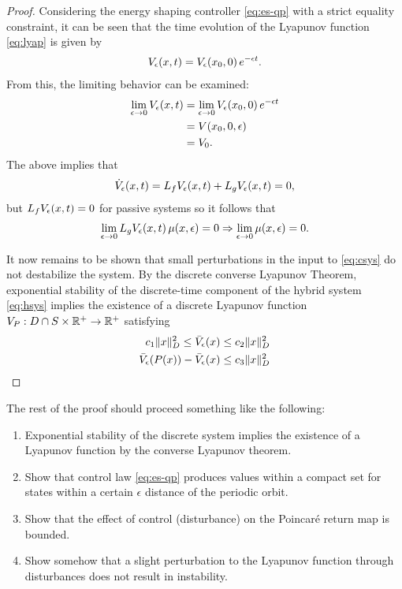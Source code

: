 \documentclass[twocolumn]{article}
\newcommand{\limeps}{\lim_{\epsilon \to 0}}
\begin{document}
\begin{proof}
  Considering the energy shaping controller \eqref{eq:es-qp} with a strict equality constraint, it can be seen that the time evolution of the Lyapunov function \eqref{eq:lyap} is given by
  \begin{align*}
    V_{\epsilon}(x, t) = V_{\epsilon}(x_{0}, 0) \, e^{-\epsilon t}.
  \end{align*}
  From this, the limiting behavior can be examined:
  \begin{align*}
    \limeps \Ve(x, t) &= \limeps \Ve(x_{0}, 0) \, e^{-\epsilon t}\\
    &= V(x_{0}, 0, \epsilon)\\
    &= V_0.
  \end{align*}
  The above implies that
  \begin{align*}
    {\dot V}_{\epsilon}(x, t) = L_{f} V_{\epsilon}(x, t) + L_{g} V_{\epsilon}(x, t) = 0,
  \end{align*}
  but $L_{f} V_{\epsilon}(x, t) = 0$ for passive systems so it follows that
  \begin{align*}
    \limeps L_{g} \Ve(x, t) \, \mu(x, \epsilon) = 0 \Rightarrow \limeps \mu(x, \epsilon) = 0.
  \end{align*}

  It now remains to be shown that small perturbations in the input to \eqref{eq:csys} do not destabilize the system.
  By the discrete converse Lyapunov Theorem, exponential stability of the discrete-time component of the hybrid system \eqref{eq:hsys} implies the existence of a discrete Lyapunov function $V_{P} : D \cap S \times \mathbb{R}^{+} \to \mathbb{R}^{+}$ satisfying
  \begin{align*}
    c_{1} \| x \|^{2}_{D} \leq \bar{V}_{\epsilon}(x) \leq c_{2} \| x \|_{D}^2\\
    \bar{V}_{\epsilon}(P(x)) - \bar{V}_{\epsilon}(x) \leq c_{3} \| x \|^{2}_{D}
  \end{align*}

\end{proof}

The rest of the proof should proceed something like the following:
\begin{enumerate}
\item Exponential stability of the discrete system implies the existence of a Lyapunov function by the converse Lyapunov theorem.
\item Show that control law \eqref{eq:es-qp} produces values within a compact set for states within a certain $\epsilon$ distance of the periodic orbit.
\item Show that the effect of control (disturbance) on the Poincar{\'e} return map is bounded.
\item Show somehow that a slight perturbation to the Lyapunov function through disturbances does not result in instability.
\end{enumerate}
\end{document}
